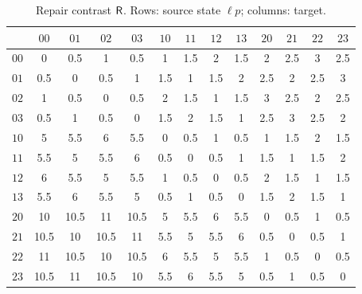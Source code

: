 \begin{table}[h]\centering\scriptsize
\setlength{\tabcolsep}{3pt}
\begin{tabular}{l|cccccccccccc}
 & $00$ & $01$ & $02$ & $03$ & $10$ & $11$ & $12$ & $13$ & $20$ & $21$ & $22$ & $23$ \\ \hline
$00$ & 0 & 0.5 & 1 & 0.5 & 1 & 1.5 & 2 & 1.5 & 2 & 2.5 & 3 & 2.5 \\
$01$ & 0.5 & 0 & 0.5 & 1 & 1.5 & 1 & 1.5 & 2 & 2.5 & 2 & 2.5 & 3 \\
$02$ & 1 & 0.5 & 0 & 0.5 & 2 & 1.5 & 1 & 1.5 & 3 & 2.5 & 2 & 2.5 \\
$03$ & 0.5 & 1 & 0.5 & 0 & 1.5 & 2 & 1.5 & 1 & 2.5 & 3 & 2.5 & 2 \\
$10$ & 5 & 5.5 & 6 & 5.5 & 0 & 0.5 & 1 & 0.5 & 1 & 1.5 & 2 & 1.5 \\
$11$ & 5.5 & 5 & 5.5 & 6 & 0.5 & 0 & 0.5 & 1 & 1.5 & 1 & 1.5 & 2 \\
$12$ & 6 & 5.5 & 5 & 5.5 & 1 & 0.5 & 0 & 0.5 & 2 & 1.5 & 1 & 1.5 \\
$13$ & 5.5 & 6 & 5.5 & 5 & 0.5 & 1 & 0.5 & 0 & 1.5 & 2 & 1.5 & 1 \\
$20$ & 10 & 10.5 & 11 & 10.5 & 5 & 5.5 & 6 & 5.5 & 0 & 0.5 & 1 & 0.5 \\
$21$ & 10.5 & 10 & 10.5 & 11 & 5.5 & 5 & 5.5 & 6 & 0.5 & 0 & 0.5 & 1 \\
$22$ & 11 & 10.5 & 10 & 10.5 & 6 & 5.5 & 5 & 5.5 & 1 & 0.5 & 0 & 0.5 \\
$23$ & 10.5 & 11 & 10.5 & 10 & 5.5 & 6 & 5.5 & 5 & 0.5 & 1 & 0.5 & 0 \\
\end{tabular}
\caption{Repair contrast $\mathsf{R}$. Rows: source state $\ell p$; columns: target.}
\end{table}

